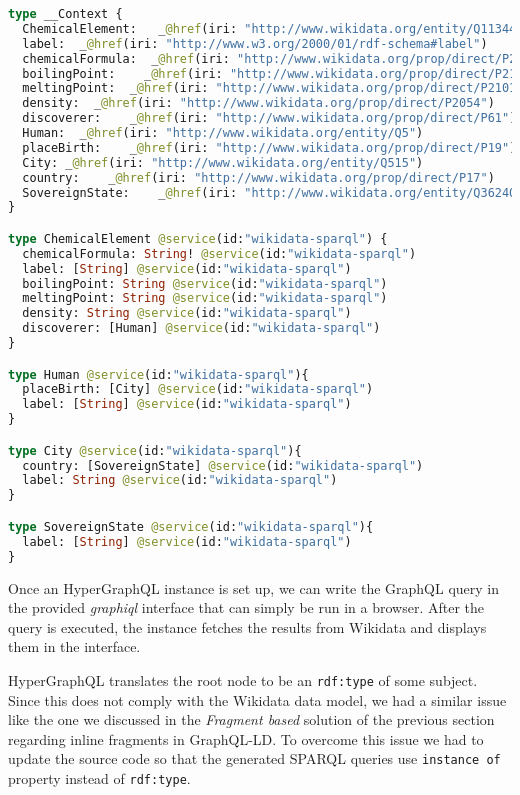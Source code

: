 \begin{minipage}{\linewidth}
\begin{lstlisting}[label=lst:32, caption={Annotated schema}, language=GraphQL]
type __Context {
  ChemicalElement:   _@href(iri: "http://www.wikidata.org/entity/Q11344")
  label:  _@href(iri: "http://www.w3.org/2000/01/rdf-schema#label")
  chemicalFormula:  _@href(iri: "http://www.wikidata.org/prop/direct/P274")
  boilingPoint:    _@href(iri: "http://www.wikidata.org/prop/direct/P2102")
  meltingPoint:  _@href(iri: "http://www.wikidata.org/prop/direct/P2101")
  density:  _@href(iri: "http://www.wikidata.org/prop/direct/P2054")
  discoverer:    _@href(iri: "http://www.wikidata.org/prop/direct/P61")
  Human:  _@href(iri: "http://www.wikidata.org/entity/Q5")
  placeBirth:    _@href(iri: "http://www.wikidata.org/prop/direct/P19")
  City: _@href(iri: "http://www.wikidata.org/entity/Q515")
  country:    _@href(iri: "http://www.wikidata.org/prop/direct/P17")
  SovereignState:    _@href(iri: "http://www.wikidata.org/entity/Q3624078")
}

type ChemicalElement @service(id:"wikidata-sparql") {
  chemicalFormula: String! @service(id:"wikidata-sparql")
  label: [String] @service(id:"wikidata-sparql")
  boilingPoint: String @service(id:"wikidata-sparql")
  meltingPoint: String @service(id:"wikidata-sparql")
  density: String @service(id:"wikidata-sparql")
  discoverer: [Human] @service(id:"wikidata-sparql")
}

type Human @service(id:"wikidata-sparql"){
  placeBirth: [City] @service(id:"wikidata-sparql")
  label: [String] @service(id:"wikidata-sparql")
}

type City @service(id:"wikidata-sparql"){
  country: [SovereignState] @service(id:"wikidata-sparql")
  label: String @service(id:"wikidata-sparql")
}

type SovereignState @service(id:"wikidata-sparql"){
  label: [String] @service(id:"wikidata-sparql")
}
\end{lstlisting}
\end{minipage}

Once an HyperGraphQL instance is set up, we can write the GraphQL query in the provided \textit{graphiql} interface that can simply be run in a browser. After the query is executed, the instance fetches the results from Wikidata and displays them in the interface. 

HyperGraphQL translates the root node to be an \texttt{rdf:type} of some subject. Since this does not comply with the Wikidata data model, we had a similar issue like the one we discussed in the \textit{Fragment based} solution of the previous section regarding inline fragments in GraphQL-LD. To overcome this issue we had to update the source code so that the generated SPARQL queries use \texttt{instance of} property instead of \texttt{rdf:type}.

